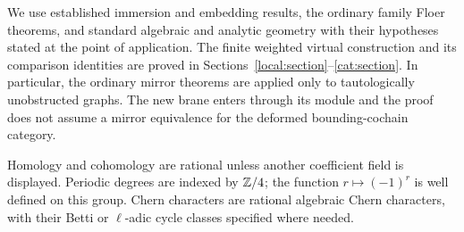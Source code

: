 We use established immersion and embedding results, the ordinary
family Floer theorems, and standard algebraic and analytic geometry with
their hypotheses stated at the point of application.  The finite
weighted virtual construction and its comparison identities are proved
in Sections~\ref{local:section}--\ref{cat:section}.  In particular, the
ordinary mirror theorems are applied only to tautologically unobstructed
graphs.  The new brane enters through its module and the proof does not
assume a mirror equivalence for the deformed bounding-cochain category.

Homology and cohomology are rational unless another coefficient field is
displayed.  Periodic degrees are indexed by $\mathbb Z/4$; the function
$r\mapsto(-1)^r$ is well defined on this group.  Chern characters are
rational algebraic Chern characters, with their Betti or $\ell$-adic
cycle classes specified where needed.
